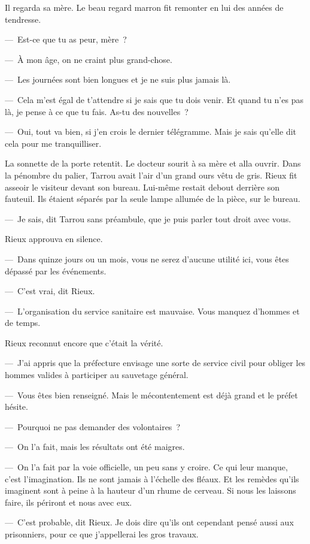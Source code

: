 \documentclass[french,twoside]{book} %
\begin{document}
Il regarda sa mère. Le beau regard marron fit remonter en lui des années de tendresse.\par
— Est-ce que tu as peur, mère ?\par
— À mon âge, on ne craint plus grand-chose.\par
— Les journées sont bien longues et je ne suis plus jamais là.\par
— Cela m’est égal de t’attendre si je sais que tu dois venir. Et quand tu n’es pas là, je pense à ce que tu fais. As-tu des nouvelles ?\par
— Oui, tout va bien, si j’en crois le dernier télégramme. Mais je sais qu’elle dit cela pour me tranquilliser.\par
La sonnette de la porte retentit. Le docteur sourit à sa mère et alla ouvrir. Dans la pénombre du palier, Tarrou avait l’air d’un grand ours vêtu de gris. Rieux fit asseoir le visiteur devant son bureau. Lui-même restait debout derrière son fauteuil. Ils étaient séparés par la seule lampe allumée de la pièce, sur le bureau.\par
— Je sais, dit Tarrou sans préambule, que je puis parler tout droit avec vous.\par
Rieux approuva en silence.\par
— Dans quinze jours ou un mois, vous ne serez d’aucune utilité ici, vous êtes dépassé par les événements.\par
— C’est vrai, dit Rieux.\par
— L’organisation du service sanitaire est mauvaise. Vous manquez d’hommes et de temps.\par
Rieux reconnut encore que c’était la vérité.\par
— J’ai appris que la préfecture envisage une sorte de service civil pour obliger les hommes valides à participer au sauvetage général.\par
— Vous êtes bien renseigné. Mais le mécontentement est déjà grand et le préfet hésite.\par
— Pourquoi ne pas demander des volontaires ?\par
— On l’a fait, mais les résultats ont été maigres.\par
— On l’a fait par la voie officielle, un peu sans y croire. Ce qui leur manque, c’est l’imagination. Ils ne sont jamais à l’échelle des fléaux. Et les remèdes qu’ils imaginent sont à peine à la hauteur d’un rhume de cerveau. Si nous les laissons faire, ils périront et nous avec eux.\par
— C’est probable, dit Rieux. Je dois dire qu’ils ont cependant pensé aussi aux prisonniers, pour ce que j’appellerai les gros travaux.\par
\end{document}

